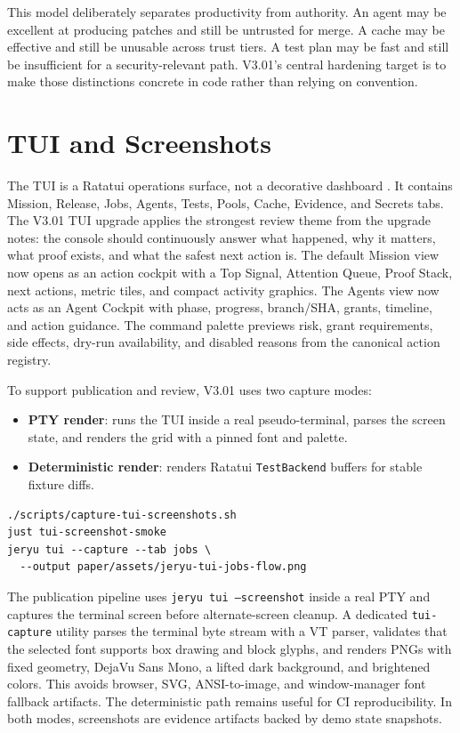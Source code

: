\documentclass[conference]{IEEEtran}
\begin{document}
This model deliberately separates productivity from authority. An agent may be excellent at producing patches and still be untrusted for merge. A cache may be effective and still be unusable across trust tiers. A test plan may be fast and still be insufficient for a security-relevant path. V3.01's central hardening target is to make those distinctions concrete in code rather than relying on convention.

\section{TUI and Screenshots}
The TUI is a Ratatui operations surface, not a decorative dashboard \cite{ratatui}. It contains Mission, Release, Jobs, Agents, Tests, Pools, Cache, Evidence, and Secrets tabs. The V3.01 TUI upgrade applies the strongest review theme from the upgrade notes: the console should continuously answer what happened, why it matters, what proof exists, and what the safest next action is. The default Mission view now opens as an action cockpit with a Top Signal, Attention Queue, Proof Stack, next actions, metric tiles, and compact activity graphics. The Agents view now acts as an Agent Cockpit with phase, progress, branch/SHA, grants, timeline, and action guidance. The command palette previews risk, grant requirements, side effects, dry-run availability, and disabled reasons from the canonical action registry.

To support publication and review, V3.01 uses two capture modes:
\begin{itemize}
\item \textbf{PTY render}: runs the TUI inside a real pseudo-terminal, parses the screen state, and renders the grid with a pinned font and palette.
\item \textbf{Deterministic render}: renders Ratatui \texttt{TestBackend} buffers for stable fixture diffs.
\end{itemize}

\begin{lstlisting}[basicstyle=\ttfamily\footnotesize]
./scripts/capture-tui-screenshots.sh
just tui-screenshot-smoke
jeryu tui --capture --tab jobs \
  --output paper/assets/jeryu-tui-jobs-flow.png
\end{lstlisting}

The publication pipeline uses \texttt{jeryu tui --screenshot} inside a real PTY and captures the terminal screen before alternate-screen cleanup. A dedicated \texttt{tui-capture} utility parses the terminal byte stream with a VT parser, validates that the selected font supports box drawing and block glyphs, and renders PNGs with fixed geometry, DejaVu Sans Mono, a lifted dark background, and brightened colors. This avoids browser, SVG, ANSI-to-image, and window-manager font fallback artifacts. The deterministic path remains useful for CI reproducibility. In both modes, screenshots are evidence artifacts backed by demo state snapshots.
\end{document}
